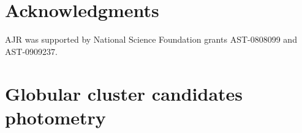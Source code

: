 \documentclass[useAMS,usenatbib]{mn2e}
\begin{document}
\lipsum[1-2]

\section*{Acknowledgments}

AJR was supported by National Science Foundation grants AST-0808099
and AST-0909237.




\appendix
\onecolumn
\section{Globular cluster candidates photometry}
\label{sec:appendix}



\lipsum[1]
\end{document}
